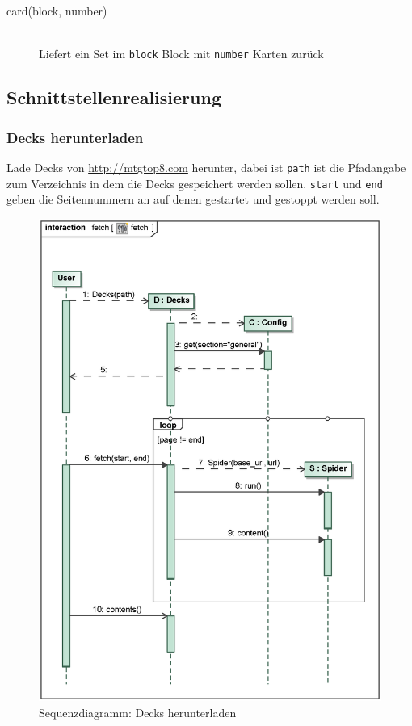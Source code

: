 \begin{description}
    \item[card(block, number)] \hfill \\
    Liefert ein Set im \verb|block| Block mit \verb|number| Karten zurück
\end{description}


\subsection{Schnittstellenrealisierung}
%
%
\subsubsection{Decks herunterladen}
Lade Decks von \url{http://mtgtop8.com} herunter, dabei ist \verb|path| ist die Pfadangabe zum Verzeichnis in dem die Decks gespeichert werden sollen. \verb|start| und \verb|end| geben die Seitennummern an auf denen gestartet und gestoppt werden soll.

\begin{figure}[H]
    \myfloatalign
    \includegraphics[width=\textwidth]{gfx/MtGDeepAnalysis/cli_fetch.eps}
    \caption{Sequenzdiagramm: Decks herunterladen}
    \label{fig:seq:fetch}
\end{figure}


